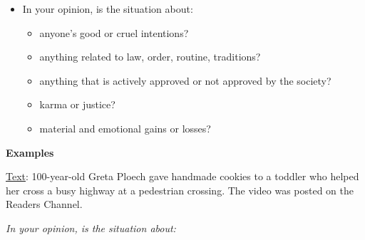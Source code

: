 \documentclass[11pt]{article}
\begin{document}
\begin{table*}[t!]
\begin{minipage}[t]{.43\linewidth}
\begin{itemize}[noitemsep,topsep=0.1pt]
    \item In your opinion, is the situation about:
        \begin{itemize}[noitemsep,topsep=0.1pt]
            \item anyone's good or cruel intentions?
            \item anything related to law, order, routine, traditions?
            \item anything that is actively approved or not approved by the society?
            \item karma or justice?
            \item material and emotional gains or losses?
        \end{itemize}
\end{itemize}



\vspace{0.2cm}
\textbf{Examples}
\vspace{0.05cm}


    \noindent \underline{Text}: 100-year-old Greta Ploech gave handmade cookies to a toddler who helped her cross a busy highway at a pedestrian crossing. The video was posted on the Readers Channel.
    
    \noindent \textit{In your opinion, is the situation about:}
    

\end{minipage}
\end{table*}
\end{document}
